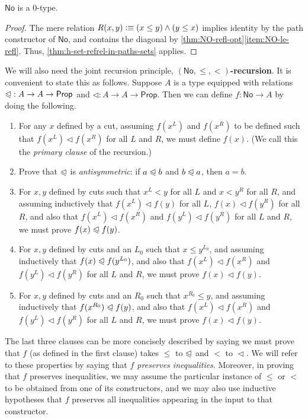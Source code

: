 \documentclass[10pt,a4paper]{article}
\providecommand{\index}[1]{}
\newcommand{\defeq}{\vcentcolon\equiv}  %
\newcommand{\define}[1]{\textbf{#1}}
\newcommand{\prop}{\ensuremath{\mathsf{Prop}}\xspace}
\newcommand{\NO}{\ensuremath{\mathsf{No}}\xspace}
\newcommand{\ble}{\trianglelefteqslant}
\newcommand{\blt}{\vartriangleleft}
\theoremstyle{definition}
\theoremstyle{remark}
\numberwithin{equation}{section}
\begin{document}
\begin{cor}\label{thm:NO-set}
  \NO is a 0-type.
\end{cor}
\begin{proof}
  The mere relation $R(x,y)\defeq (x\le y) \land (y\le x)$ implies identity by the path constructor of $\NO$, and contains the diagonal by \cref{thm:NO-refl-opt}\ref{item:NO-le-refl}.
  Thus, \cref{thm:h-set-refrel-in-paths-sets} applies.
\end{proof}

We will also need the joint recursion principle, \define{$(\NO,\le,<)$-recursion}.
It is convenient to state this as follows.
Suppose $A$ is a type equipped with relations $\mathord\ble:A\to A\to\prop$ and $\mathord\blt:A\to A\to\prop$.
Then we can define $f:\NO\to A$ by doing the following.
\begin{enumerate}
\item For any $x$ defined by a cut, assuming $f(x^L)$ and $f(x^R)$ to be defined such that $f(x^L)\blt f(x^R)$ for all $L$ and $R$, we must define $f(x)$.  (We call this the \emph{primary clause} of the recursion.)\label{item:NO-rec-primary}
\item Prove that $\ble$ is \emph{antisymmetric}\index{relation!antisymmetric}: if $a\ble b$ and $b\ble a$, then $a=b$.
\item For $x,y$ defined by cuts such that $x^L<y$ for all $L$ and $x<y^R$ for all $R$, and assuming inductively that $f(x^L)\blt f(y)$ for all $L$, $f(x)\blt f(y^R)$ for all $R$, and also that $f(x^L)\blt f(x^R)$ and $f(y^L)\blt f(y^R)$ for all $L$ and $R$, we must prove $f(x)\ble f(y)$.
\item For $x,y$ defined by cuts and an $L_0$ such that $x\le y^{L_0}$, and assuming inductively that $f(x)\ble f(y^{L_0})$, and also that $f(x^L)\blt f(x^R)$ and $f(y^L)\blt f(y^R)$ for all $L$ and $R$, we must prove $f(x)\blt f(y)$.
\item For $x,y$ defined by cuts and an $R_0$ such that $x^{R_0}\le y$, and assuming inductively that $f(x^{R_0})\ble f(y)$, and also that $f(x^L)\blt f(x^R)$ and $f(y^L)\blt f(y^R)$ for all $L$ and $R$, we must prove $f(x)\blt f(y)$.\label{item:NO-rec-last}
\end{enumerate}
The last three clauses can be more concisely described by saying we must prove that $f$ (as defined in the first clause) takes $\le$ to $\ble$ and $<$ to $\blt$.
We will refer to these properties by saying that \emph{$f$ preserves inequalities}.
Moreover, in proving that $f$ preserves inequalities, we may assume the particular instance of $\le$ or $<$ to be obtained from one of its constructors, and we may also use inductive hypotheses that $f$ preserves all inequalities appearing in the input to that constructor.
\end{document}
